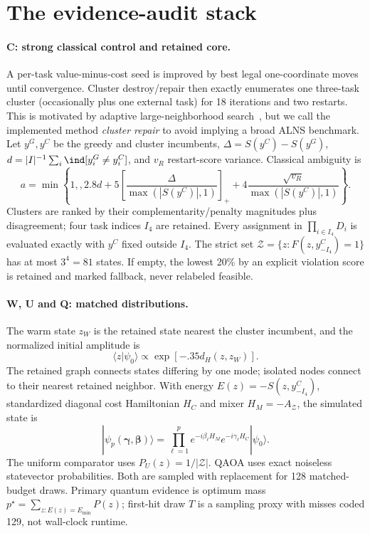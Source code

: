 \section{The \UWCQ{} evidence-audit stack}
\label{sec:framework}

\paragraph{C: strong classical control and retained core.}
A per-task value-minus-cost seed is improved by best legal one-coordinate moves until convergence. Cluster destroy/repair then exactly enumerates one three-task cluster (occasionally plus one external task) for 18 iterations and two restarts. This is motivated by adaptive large-neighborhood search~\citep{ropke2006alns}, but we call the implemented method \emph{cluster repair} to avoid implying a broad ALNS benchmark. Let $y^G,y^C$ be the greedy and cluster incumbents, $\Delta=S(y^C)-S(y^G)$, $d=|I|^{-1}\sum_i\ind[y_i^G\ne y_i^C]$, and $v_R$ restart-score variance. Classical ambiguity is
\begin{equation}
 a=\min\!\left\{1,,2.8d+5\left[\frac{\Delta}{\max(|S(y^C)|,1)}\right]_+ +4\frac{\sqrt{v_R}}{\max(|S(y^C)|,1)}\right\}.
 \label{eq:ambiguity}
\end{equation}
Clusters are ranked by their complementarity/penalty magnitudes plus disagreement; four task indices $I_4$ are retained. Every assignment in $\prod_{i\in I_4}D_i$ is evaluated exactly with $y^C$ fixed outside $I_4$. The strict set $\mathcal Z=\{z:F(z,y^C_{-I_4})=1\}$ has at most $3^4=81$ states. If empty, the lowest 20\% by an explicit violation score is retained and marked fallback, never relabeled feasible.

\paragraph{W, U and Q: matched distributions.}
The warm state $z_W$ is the retained state nearest the cluster incumbent, and the normalized initial amplitude is
\begin{equation}
 \langle z|\psi_0\rangle\propto\exp[-.35d_H(z,z_W)].
 \label{eq:warm}
\end{equation}
The retained graph connects states differing by one mode; isolated nodes connect to their nearest retained neighbor. With energy $E(z)=-S(z,y^C_{-I_4})$, standardized diagonal cost Hamiltonian $H_C$ and mixer $H_M=-A_{\mathcal Z}$, the simulated state is
\begin{equation}
 |\psi_p(\boldsymbol\gamma,\boldsymbol\beta)\rangle=\prod_{\ell=1}^{p}e^{-i\beta_\ell H_M}e^{-i\gamma_\ell H_C}|\psi_0\rangle.
 \label{eq:qaoa}
\end{equation}
The uniform comparator uses $P_U(z)=1/|\mathcal Z|$. QAOA uses exact noiseless statevector probabilities. Both are sampled with replacement for 128 matched-budget draws. Primary quantum evidence is optimum mass $p^\star=\sum_{z:E(z)=E_{\min}}P(z)$; first-hit draw $T$ is a sampling proxy with misses coded 129, not wall-clock runtime.


